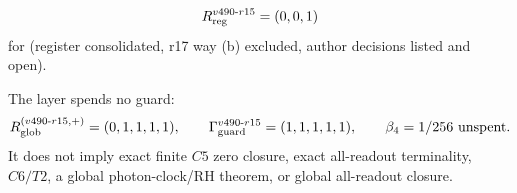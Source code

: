 \[
R_{\rm reg}^{v490\text{-}r15}=(0,0,1)
\]
for (register consolidated, r17 way (b) excluded, author decisions listed and open).

The layer spends no guard:
\[
R_{\rm glob}^{(v490\text{-}r15,+)}=(0,1,1,1,1),
\qquad
\Gamma_{\rm guard}^{v490\text{-}r15}=(1,1,1,1,1),
\qquad
\beta_4=1/256\ \text{unspent}.
\]
It does not imply exact finite \(C5\) zero closure, exact all-readout terminality,
\(C6/T2\), a global photon-clock/RH theorem, or global all-readout closure.

